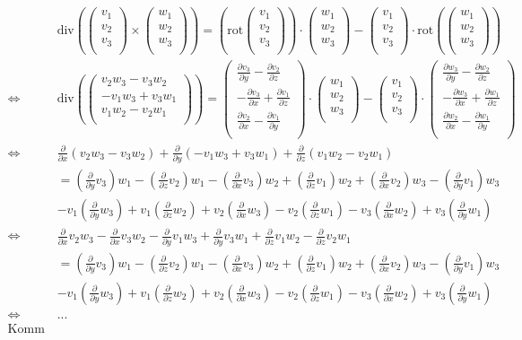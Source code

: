 \documentclass[10pt,a4paper,parskip=half]{scrartcl}
\newcommand{\vecthree}[3]{\begin{pmatrix}#1\\#2\\#3\\\end {pmatrix}}
\begin{document}
\begin{align*}
&\text{div}\left(\vecthree{v_1}{v_2}{v_3} \times \vecthree{w_1}{w_2}{w_3}\right) = \left( \text{rot} \vecthree{v_1}{v_2}{v_3} \right) \cdot \vecthree{w_1}{w_2}{w_3} - \vecthree{v_1}{v_2}{v_3} \cdot \text{rot}\left( \vecthree{w_1}{w_2}{w_3} \right) \\
\Leftrightarrow\; &\text{div}\left(\vecthree{v_2w_3 - v_3w_2}{-v_1w_3 + v_3w_1}{v_1w_2 - v_2w_1}\right) = \vecthree{\frac{\partial v_3}{\partial y} - \frac{\partial v_2}{\partial z}}{- \frac{\partial v_3}{\partial x} + \frac{\partial v_1}{\partial z}}{\frac{\partial v_2}{\partial x} - \frac{\partial v_1}{\partial y}} \cdot \vecthree{w_1}{w_2}{w_3} - \vecthree{v_1}{v_2}{v_3} \cdot \vecthree{\frac{\partial w_3}{\partial y} - \frac{\partial w_2}{\partial z}}{- \frac{\partial w_3}{\partial x} + \frac{\partial w_1}{\partial z}}{\frac{\partial w_2}{\partial x} - \frac{\partial w_1}{\partial y}} \\
\Leftrightarrow\; &\frac{\partial }{\partial x}(v_2w_3 - v_3w_2) + \frac{\partial }{\partial y}(-v_1w_3 + v_3w_1) + \frac{\partial }{\partial z}(v_1w_2 - v_2w_1)\\
&= \left(\frac{\partial }{\partial y}v_3\right)w_1 - \left(\frac{\partial }{\partial z}v_2\right)w_1 - \left(\frac{\partial }{\partial x}v_3\right)w_2 + \left(\frac{\partial }{\partial z}v_1\right)w_2 + \left(\frac{\partial }{\partial x}v_2\right)w_3 - \left(\frac{\partial }{\partial y}v_1\right)w_3\\
 &- v_1\left(\frac{\partial }{\partial y}w_3\right) + v_1\left(\frac{\partial }{\partial z}w_2\right) + v_2\left(\frac{\partial }{\partial x}w_3\right) - v_2\left(\frac{\partial }{\partial z}w_1\right) - v_3\left(\frac{\partial }{\partial x}w_2\right) + v_3\left(\frac{\partial }{\partial y}w_1\right) \\
\Leftrightarrow\; &\frac{\partial }{\partial x}v_2w_3 - \frac{\partial }{\partial x}v_3w_2 - \frac{\partial }{\partial y}v_1w_3 + \frac{\partial }{\partial y}v_3w_1 + \frac{\partial }{\partial z}v_1w_2 - \frac{\partial }{\partial z}v_2w_1\\
&= \left(\frac{\partial }{\partial y}v_3\right)w_1 - \left(\frac{\partial }{\partial z}v_2\right)w_1 - \left(\frac{\partial }{\partial x}v_3\right)w_2 + \left(\frac{\partial }{\partial z}v_1\right)w_2 + \left(\frac{\partial }{\partial x}v_2\right)w_3 - \left(\frac{\partial }{\partial y}v_1\right)w_3\\
 &- v_1\left(\frac{\partial }{\partial y}w_3\right) + v_1\left(\frac{\partial }{\partial z}w_2\right) + v_2\left(\frac{\partial }{\partial x}w_3\right) - v_2\left(\frac{\partial }{\partial z}w_1\right) - v_3\left(\frac{\partial }{\partial x}w_2\right) + v_3\left(\frac{\partial }{\partial y}w_1\right) \\
\Leftrightarrow\; &\text{...}\\
\text{Komm grad nicht auf die Lösung}
\end{align*}
\end{document}
